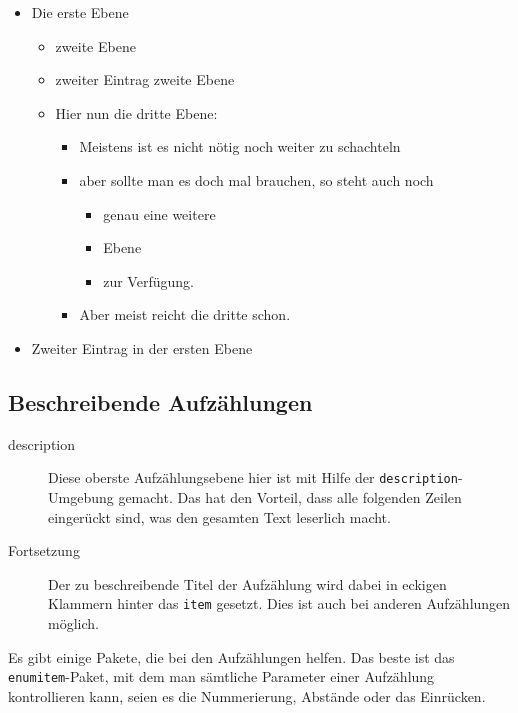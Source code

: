 \begin{itemize}
	\item Die erste Ebene
		\begin{itemize}
			\item zweite Ebene

			\item zweiter Eintrag zweite Ebene

			\item Hier nun die dritte Ebene:
				\begin{itemize}
					\item Meistens ist es nicht nötig noch weiter zu schachteln

					\item aber sollte man es doch mal brauchen, so steht auch noch
						\begin{itemize}
							\item genau eine weitere

							\item Ebene

							\item zur Verfügung.
						\end{itemize}

					\item Aber meist reicht die dritte schon.
				\end{itemize}
		\end{itemize}

	\item Zweiter Eintrag in der ersten Ebene
\end{itemize}

\subsection{Beschreibende Aufzählungen}

\begin{description}
	\item[description] Diese oberste Aufzählungsebene hier ist mit Hilfe der \texttt{description}-Umgebung
		gemacht. Das hat den Vorteil, dass alle folgenden Zeilen eingerückt sind, was
		den gesamten Text leserlich macht.

	\item[Fortsetzung] Der zu beschreibende Titel der Aufzählung wird dabei in eckigen
		Klammern hinter das \texttt{item} gesetzt. Dies ist auch bei anderen Aufzählungen
		möglich.
\end{description}

Es gibt einige Pakete, die bei den Aufzählungen helfen. Das beste ist das
\texttt{enumitem}-Paket, mit dem man sämtliche Parameter einer Aufzählung
kontrollieren kann, seien es die Nummerierung, Abstände oder das Einrücken.

